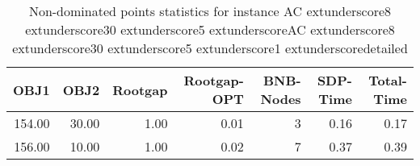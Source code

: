 \begin{table}
\caption{Non-dominated points statistics for instance AC	extunderscore8	extunderscore30	extunderscore5	extunderscoreAC	extunderscore8	extunderscore30	extunderscore5	extunderscore1	extunderscoredetailed}
\label{tab:stats/AC_8_30_5_AC_8_30_5_1_detailed}
\begin{tabular}{rrrrrrr}
\toprule
OBJ1 & OBJ2 & Rootgap & Rootgap-OPT & BNB-Nodes & SDP-Time & Total-Time \\
\midrule
154.00 & 30.00 & 1.00 & 0.01 & 3 & 0.16 & 0.17 \\
156.00 & 10.00 & 1.00 & 0.02 & 7 & 0.37 & 0.39 \\
\bottomrule
\end{tabular}
\end{table}
